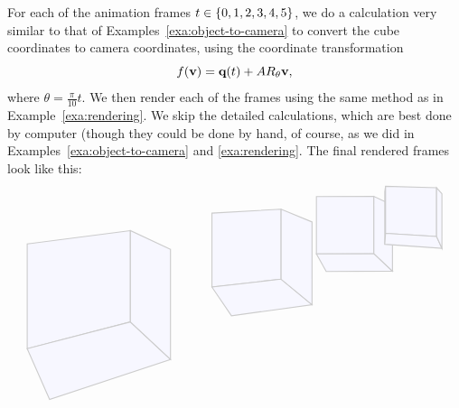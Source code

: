 \begin{solution}
  For each of the animation frames $t\in\left\{0,1,2,3,4,5\right\}$, we do a
  calculation very similar to that of
  Examples~\ref{exa:object-to-camera} to convert the cube coordinates
  to camera coordinates, using the coordinate transformation
  \begin{equation*}
    f(\mbox{\bf v}) = \mbox{\bf q}(t) + AR_{\theta}\mbox{\bf v},
  \end{equation*}
  where $\theta=\frac{\pi}{10}t$. We then render each of the frames
  using the same method as in Example~\ref{exa:rendering}. We skip the
  detailed calculations, which are best done by computer (though they
  could be done by hand, of course, as we did in
  Examples~\ref{exa:object-to-camera} and {\ref{exa:rendering}}. The
  final rendered frames look like this:
  \begin{equation*}
    \begin{tikzpicture}[scale=12, thick]
      \draw[black!20,fill=blue!3] (-0.2979,-0.2128) -- (-0.5366,-0.2439) -- (-0.5366,-0.4878) -- (-0.2979,-0.4255) -- cycle;
      \draw[black!20,fill=blue!3] (-0.2051,-0.5128) -- (-0.2979,-0.4255) -- (-0.5366,-0.4878) -- (-0.4848,-0.6061) -- cycle;
      \draw[black!20,fill=blue!3] (-0.2051,-0.2564) -- (-0.2979,-0.2128) -- (-0.2979,-0.4255) -- (-0.2051,-0.5128) -- cycle;
      
      \draw[black!20,fill=blue!3] (0.0508,-0.1630) -- (-0.1092,-0.1721) -- (-0.1092,-0.3442) -- (0.0508,-0.3260) -- cycle;
      \draw[black!20,fill=blue!3] (0.1224,-0.3855) -- (0.0508,-0.3260) -- (-0.1092,-0.3442) -- (-0.0640,-0.4111) -- cycle;
      \draw[black!20,fill=blue!3] (0.1224,-0.1927) -- (0.0508,-0.1630) -- (0.0508,-0.3260) -- (0.1224,-0.3855) -- cycle;
      
      \draw[black!20,fill=blue!3] (0.2654,-0.1332) -- (0.1325,-0.1335) -- (0.1325,-0.2669) -- (0.2654,-0.2664) -- cycle;
      \draw[black!20,fill=blue!3] (0.3085,-0.3073) -- (0.2654,-0.2664) -- (0.1325,-0.2669) -- (0.1552,-0.3080) -- cycle;
      \draw[black!20,fill=blue!3] (0.3085,-0.1537) -- (0.2654,-0.1332) -- (0.2654,-0.2664) -- (0.3085,-0.3073) -- cycle;

      \draw[black!20,fill=blue!3] (0.2907,-0.1224) -- (0.2907,-0.2448) -- (0.2925,-0.2192) -- (0.2925,-0.1096) -- cycle;
      \draw[black!20,fill=blue!3] (0.4105,-0.1132) -- (0.2925,-0.1096) -- (0.2925,-0.2192) -- (0.4105,-0.2265) -- cycle;
      \draw[black!20,fill=blue!3] (0.4229,-0.2540) -- (0.4105,-0.2265) -- (0.2925,-0.2192) -- (0.2907,-0.2448) -- cycle;
      \draw[black!20,fill=blue!3] (0.4229,-0.1270) -- (0.4105,-0.1132) -- (0.4105,-0.2265) -- (0.4229,-0.2540) -- cycle;


\end{tikzpicture}
\end{equation*}
\end{solution}
